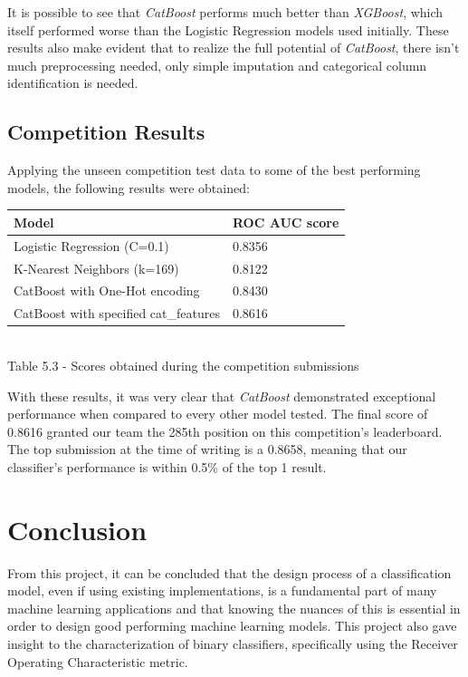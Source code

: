 \documentclass{IEEEtran}
\begin{document}
It is possible to see that \textit{CatBoost} performs much better than \textit{XGBoost}, which itself performed worse than the Logistic Regression models used initially. These results also make evident that to realize the full potential of \textit{CatBoost}, there isn't much preprocessing needed, only simple imputation and categorical column identification is needed.

\subsection{Competition Results}

Applying the unseen competition test data to some of the best performing models, the following results were obtained:

\begin{center}
    \begin{tabular}{|l|l|}
        \hline
    \textbf{Model} & \textbf{ROC AUC score} \\ 
    \hline \hline
    Logistic Regression (C=0.1) & 0.8356 \\ \hline
    K-Nearest Neighbors (k=169) & 0.8122 \\ \hline
    CatBoost with One-Hot encoding & 0.8430 \\ \hline
    CatBoost with specified cat\_features & 0.8616 \\ \hline
    \end{tabular}\\
    
    \vspace{6pt}
    Table 5.3 - Scores obtained during the competition submissions
\end{center}

With these results, it was very clear that \textit{CatBoost} demonstrated exceptional performance when compared to every other model tested. The final score of 0.8616 granted our team the 285th position on this competition's leaderboard. The top submission at the time of writing is a 0.8658, meaning that our classifier's performance is within 0.5\% of the top 1 result.

\section{Conclusion}

From this project, it can be concluded that the design process of a classification model, even if using existing implementations, is a fundamental part of many machine learning applications and that knowing the nuances of this is essential in order to design good performing machine learning models. This project also gave insight to the characterization of binary classifiers, specifically using the Receiver Operating Characteristic metric. 
\end{document}
